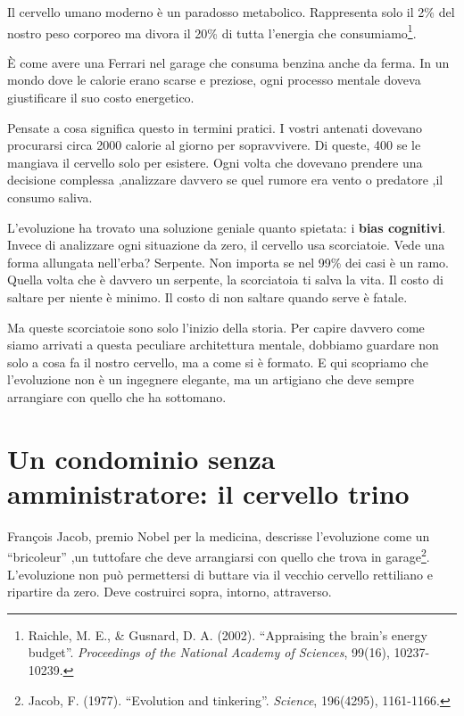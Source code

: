 Il cervello umano moderno è un paradosso metabolico. Rappresenta solo il 2\% del nostro peso corporeo ma divora il 20\% di tutta l'energia che consumiamo\footnote{Raichle, M. E., \& Gusnard, D. A. (2002). ``Appraising the brain's energy budget''. \textit{Proceedings of the National Academy of Sciences}, 99(16), 10237-10239.}.

È come avere una Ferrari nel garage che consuma benzina anche da ferma. In un mondo dove le calorie erano scarse e preziose, ogni processo mentale doveva giustificare il suo costo energetico.

Pensate a cosa significa questo in termini pratici. I vostri antenati dovevano procurarsi circa 2000 calorie al giorno per sopravvivere. Di queste, 400 se le mangiava il cervello solo per esistere. Ogni volta che dovevano prendere una decisione complessa ,analizzare davvero se quel rumore era vento o predatore ,il consumo saliva.

L'evoluzione ha trovato una soluzione geniale quanto spietata: i \textbf{bias cognitivi}. Invece di analizzare ogni situazione da zero, il cervello usa scorciatoie. Vede una forma allungata nell'erba? Serpente. Non importa se nel 99\% dei casi è un ramo. Quella volta che è davvero un serpente, la scorciatoia ti salva la vita. Il costo di saltare per niente è minimo. Il costo di non saltare quando serve è fatale.

Ma queste scorciatoie sono solo l'inizio della storia. Per capire davvero come siamo arrivati a questa peculiare architettura mentale, dobbiamo guardare non solo a cosa fa il nostro cervello, ma a come si è formato. E qui scopriamo che l'evoluzione non è un ingegnere elegante, ma un artigiano che deve sempre arrangiare con quello che ha sottomano.
\section{Un condominio senza amministratore: il cervello trino}
François Jacob, premio Nobel per la medicina, descrisse l'evoluzione come un ``bricoleur'' ,un tuttofare che deve arrangiarsi con quello che trova in garage\footnote{Jacob, F. (1977). ``Evolution and tinkering''. \textit{Science}, 196(4295), 1161-1166.}. L'evoluzione non può permettersi di buttare via il vecchio cervello rettiliano e ripartire da zero. Deve costruirci sopra, intorno, attraverso.


